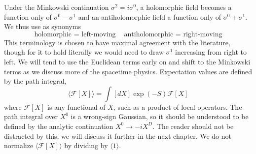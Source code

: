 Under the Minkowski continuation $\sigma^{2}=i \sigma^{0}$, a holomorphic field becomes a function only of $\sigma^{0}-\sigma^{1}$ and an antiholomorphic field a function only of $\sigma^{0}+\sigma^{1}$. We thus use as synonyms
\begin{subequations}
\begin{equation}
\text { holomorphic }=\text { left-moving }
\end{equation}
\begin{equation}
\text { antiholomorphic }=\text { right-moving }
\end{equation}
\end{subequations}
This terminology is chosen to have maximal agreement with the literature, though for it to hold literally we would need to draw $\sigma^{1}$ increasing from right to left. We will tend to use the Euclidean terms early on and shift to the Minkowski terms as we discuss more of the spacetime physics. Expectation values are defined by the path integral,
\begin{equation}
\langle\mathscr{F}[X]\rangle=\int[d X] \exp (-S) \mathscr{F}[X]
\end{equation}
where $\mathscr{F}[X]$ is any functional of $X$, such as a product of local operators. The path integral over $X^{0}$ is a wrong-sign Gaussian, so it should be understood to be defined by the analytic continuation $X^{0} \rightarrow-i X^{D}$. The reader should not be distracted by this; we will discuss it further in the next chapter. We do not normalize $\langle\mathscr{F}[X]\rangle$ by dividing by $\langle 1\rangle .$

